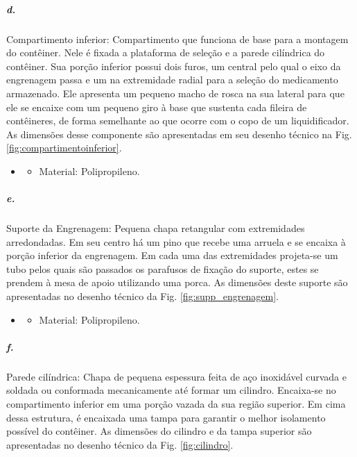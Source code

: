     
    \subparagraph*{d.} \label{retorno_compartimentoinferior}
    Compartimento inferior: Compartimento que funciona de base para a montagem do contêiner. Nele é fixada a plataforma de seleção e a parede cilíndrica do contêiner. Sua porção inferior possui dois furos, um central pelo qual o eixo da engrenagem passa e um na extremidade radial para a seleção do medicamento armazenado. Ele apresenta um pequeno macho de rosca na sua lateral para que ele se encaixe com um pequeno giro à base que sustenta cada fileira de contêineres, de forma semelhante ao que ocorre com o copo de um liquidificador. As dimensões desse componente são apresentadas em seu desenho técnico na Fig. \ref{fig:compartimentoinferior}.
    
    \begin{itemize}
   \item[]
   \begin{itemize}
       \item Material: Polipropileno.
   \end{itemize}
   \end{itemize}
     

    \subparagraph*{e.} \label{retorno_suporte_engrenagem}
    Suporte da Engrenagem: Pequena chapa retangular com extremidades arredondadas. Em seu centro há um pino que recebe uma arruela e se encaixa à porção inferior da engrenagem. Em cada uma das extremidades projeta-se um tubo pelos quais são passados os parafusos de fixação do suporte, estes se prendem à mesa de apoio utilizando uma porca. As dimensões deste suporte são apresentadas no desenho técnico da Fig. \ref{fig:supp_engrenagem}.
    
    \begin{itemize}
   \item[]
   \begin{itemize}
       \item Material: Polipropileno.
   \end{itemize}
   \end{itemize}
     
   
    \subparagraph*{f.}\label{retorno_cilindro}
    Parede cilíndrica: Chapa de pequena espessura feita de aço inoxidável curvada e soldada ou conformada mecanicamente até formar um cilindro. Encaixa-se no compartimento inferior em uma porção vazada da sua região superior. Em cima dessa estrutura, é encaixada uma tampa para garantir o melhor isolamento possível do contêiner. As dimensões do cilindro e da tampa  superior são apresentadas no desenho técnico da Fig. \ref{fig:cilindro}.
    
